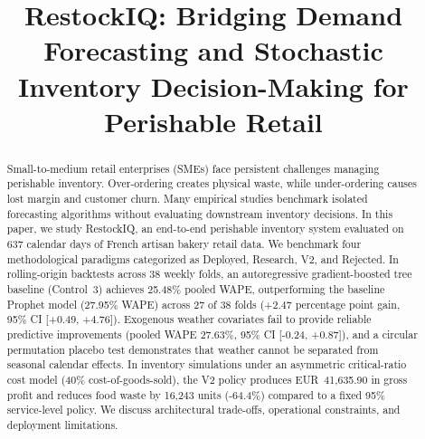 \documentclass[conference]{IEEEtran}
\begin{document}
\title{RestockIQ: Bridging Demand Forecasting and Stochastic Inventory Decision-Making for Perishable Retail}

\author{
\and
{}
\and
{}
\and
{}
}

\maketitle

\begin{abstract}
Small-to-medium retail enterprises (SMEs) face persistent challenges managing perishable inventory. Over-ordering creates physical waste, while under-ordering causes lost margin and customer churn. Many empirical studies benchmark isolated forecasting algorithms without evaluating downstream inventory decisions. In this paper, we study RestockIQ, an end-to-end perishable inventory system evaluated on 637 calendar days of French artisan bakery retail data. We benchmark four methodological paradigms categorized as Deployed, Research, V2, and Rejected. In rolling-origin backtests across 38 weekly folds, an autoregressive gradient-boosted tree baseline (Control~3) achieves 25.48\% pooled WAPE, outperforming the baseline Prophet model (27.95\% WAPE) across 27 of 38 folds (+2.47 percentage point gain, 95\% CI [+0.49, +4.76]). Exogenous weather covariates fail to provide reliable predictive improvements (pooled WAPE 27.63\%, 95\% CI [-0.24, +0.87]), and a circular permutation placebo test demonstrates that weather cannot be separated from seasonal calendar effects. In inventory simulations under an asymmetric critical-ratio cost model (40\% cost-of-goods-sold), the V2 policy produces EUR~41,635.90 in gross profit and reduces food waste by 16,243 units (-64.4\%) compared to a fixed 95\% service-level policy. We discuss architectural trade-offs, operational constraints, and deployment limitations.
\end{abstract}
\end{document}
